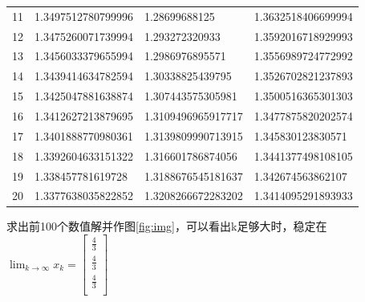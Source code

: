 \begin{table}[H]
\begin{tabular}{llll}
     11                    & 1.3497512780799996                       & 1.28699688125                               & 1.3632518406699994                       \\
     12                    & 1.3475260071739994                       & 1.293272320933                              & 1.3592016718929993                       \\
     13                    & 1.3456033379655994                       & 1.2986976895571                             & 1.3556989724772992                       \\
     14                    & 1.3439414634782594                       & 1.30338825439795                            & 1.3526702821237893                       \\
     15                    & 1.3425047881638874                       & 1.307443575305981                           & 1.3500516365301303                       \\
     16                    & 1.3412627213879695                       & 1.3109496965917717                          & 1.3477875820202574                       \\
     17                    & 1.3401888770980361                       & 1.3139809990713915                          & 1.345830123830571                        \\
     18                    & 1.3392604633151322                       & 1.316601786874056                           & 1.3441377498108105                       \\
     19                    & 1.338457781619728                        & 1.3188676545181637                          & 1.342674563862107                        \\
     20                    & 1.3377638035822852                       & 1.3208266672283202                          & 1.3414095291893933                       \\ \hline
    \end{tabular}
\end{table}

求出前100个数值解并作图\ref{fig:img}，可以看出k足够大时，稳定在$\lim_{k\rightarrow\infty}x_k = 
\begin{bmatrix}
    \frac{4}{3}\\
    \frac{4}{3}\\
    \frac{4}{3}\\
\end{bmatrix}$

